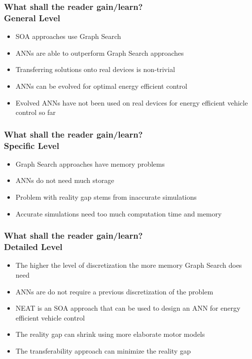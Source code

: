 \documentclass[8pt]{beamer}
\begin{document}
\begin{frame}
\frametitle{What shall the reader gain/learn?\\General Level}
\begin{itemize}
	\item SOA approaches use Graph Search
	\item ANNs are able to outperform Graph Search approaches
	\item Transferring solutions onto real devices is non-trivial
	\item ANNs can be evolved for optimal energy efficient control
	\item Evolved ANNs have not been used on real devices for energy efficient vehicle control so far
\end{itemize}
\end{frame}

\begin{frame}
\frametitle{What shall the reader gain/learn?\\Specific Level}
\begin{itemize}
	\item Graph Search approaches have memory problems
	\item ANNs do not need much storage
	\item Problem with reality gap stems from inaccurate simulations
	\item Accurate simulations need too much computation time and memory
\end{itemize}
\end{frame}

\begin{frame}
\frametitle{What shall the reader gain/learn?\\Detailed Level}
\begin{itemize}
	\item The higher the level of discretization the more memory Graph Search does need
	\item ANNs are do not require a previous discretization of the problem
	\item NEAT is an SOA approach that can be used to design an ANN for energy efficient vehicle control
	\item The reality gap can shrink using more elaborate motor models
	\item The transferability approach can minimize the reality gap
\end{itemize}
\end{frame}
\end{document}
